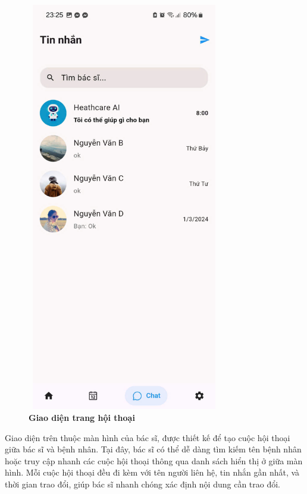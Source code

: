 \begin{figure}[H]
	\centering
	\includegraphics[width=8.5cm,height=18cm]{Images/AppUI/chatDoctor.jpg}
	\caption[Giao diện trang hội thoại]{\bfseries \fontsize{12pt}{0pt}\selectfont Giao diện trang hội thoại}
	\label{chat}
\end{figure}
Giao diện trên thuộc màn hình của bác sĩ, được thiết kế để tạo cuộc hội thoại giữa bác sĩ và bệnh nhân. Tại đây, bác sĩ có thể dễ dàng tìm kiếm tên bệnh nhân hoặc truy cập nhanh các cuộc hội thoại thông qua danh sách hiển thị ở giữa màn hình. Mỗi cuộc hội thoại đều đi kèm với tên người liên hệ, tin nhắn gần nhất, và thời gian trao đổi, giúp bác sĩ nhanh chóng xác định nội dung cần trao đổi.

